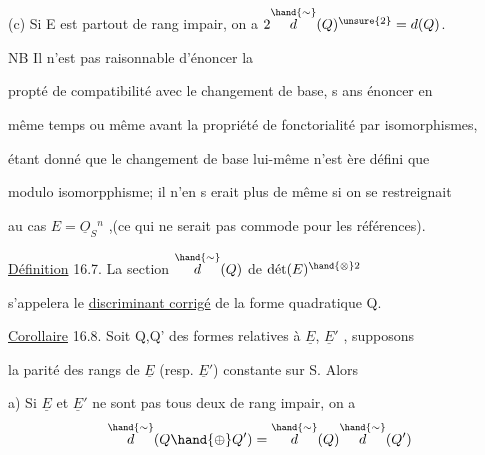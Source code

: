 
(c) Si E est partout de rang impair, on a $2\overset{\hand{\sim}}{d}(Q)^{\unsure{2}} = d(Q)$.


 \quad NB Il n'est pas raisonnable d'énoncer la

propté de compatibilité avec le changement de base, s ans énoncer en

même temps\hand{,} ou même avant\hand{,} la propriété de fonctorialité par isomorphismes,

étant donné que le changement de base  lui-même n'est ère défini que

modulo isomorpphisme; il n'en s erait plus de même si on se restreignait

au cas $E = \underline{O}_S{}^n$ ,(ce qui ne serait pas commode pour les références).

 \quad \uline{Définition} 16.7. La section $\overset{\hand{\sim}}{d}(Q)$ de $\text{dét}(E)^{\hand{\otimes}2}$

s'appelera le \uline{discriminant corrigé} de la forme quadratique Q.

\uline{Corollaire} 16.8. Soit Q,Q' des formes relatives à $\underline{E}$, $\underline{E}'$ , supposons

la parité des rangs de $\underline{E}$ (resp. $\underline{E}'$) constante sur S. Alors

a) Si $\underline{E}$ et $\underline{E}'$ ne sont pas tous deux de rang impair, on a
\[ \overset{\hand{\sim}}{d}(Q \hand{\oplus} Q') = \overset{\hand{\sim}}{d}(Q)\overset{\hand{\sim}}{d}(Q') \]

